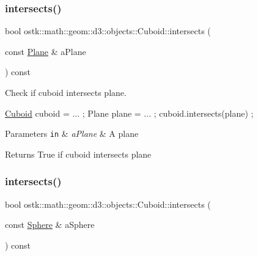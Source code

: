 \subsubsection{\texorpdfstring{intersects()}{intersects()}\hspace{0.1cm}{\footnotesize\ttfamily [6/9]}}
{\footnotesize\ttfamily bool ostk\+::math\+::geom\+::d3\+::objects\+::\+Cuboid\+::intersects (\begin{DoxyParamCaption}\item[{const \hyperlink{classostk_1_1math_1_1geom_1_1d3_1_1objects_1_1_plane}{Plane} \&}]{a\+Plane }\end{DoxyParamCaption}) const}



Check if cuboid intersects plane. 


\begin{DoxyCode}
\hyperlink{classostk_1_1math_1_1geom_1_1d3_1_1objects_1_1_cuboid_a1da071d7cbb0a694348628f098f77c5b}{Cuboid} cuboid = ... ;
Plane plane = ... ;
cuboid.intersects(plane) ;
\end{DoxyCode}



\begin{DoxyParams}[1]{Parameters}
\mbox{\tt in}  & {\em a\+Plane} & A plane \\
\hline
\end{DoxyParams}
\begin{DoxyReturn}{Returns}
True if cuboid intersects plane 
\end{DoxyReturn}
\mbox{\label{classostk_1_1math_1_1geom_1_1d3_1_1objects_1_1_cuboid_aba72527a8c264f7ca79dc304e8a29fc8}} 
\subsubsection{\texorpdfstring{intersects()}{intersects()}\hspace{0.1cm}{\footnotesize\ttfamily [7/9]}}
{\footnotesize\ttfamily bool ostk\+::math\+::geom\+::d3\+::objects\+::\+Cuboid\+::intersects (\begin{DoxyParamCaption}\item[{const \hyperlink{classostk_1_1math_1_1geom_1_1d3_1_1objects_1_1_sphere}{Sphere} \&}]{a\+Sphere }\end{DoxyParamCaption}) const}




